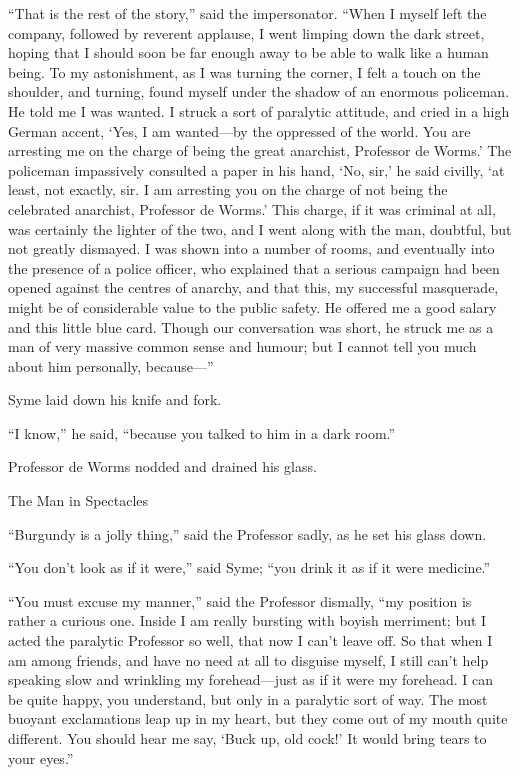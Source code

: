 “That is the rest of the story,” said the impersonator. “When I myself left the company, followed by reverent applause, I went limping down the dark street, hoping that I should soon be far enough away to be able to walk like a human being. To my astonishment, as I was turning the corner, I felt a touch on the shoulder, and turning, found myself under the shadow of an enormous policeman. He told me I was wanted. I struck a sort of paralytic attitude, and cried in a high German accent, ‘Yes, I am wanted⁠—by the oppressed of the world. You are arresting me on the charge of being the great anarchist, Professor de Worms.’ The policeman impassively consulted a paper in his hand, ‘No, sir,’ he said civilly, ‘at least, not exactly, sir. I am arresting you on the charge of not being the celebrated anarchist, Professor de Worms.’ This charge, if it was criminal at all, was certainly the lighter of the two, and I went along with the man, doubtful, but not greatly dismayed. I was shown into a number of rooms, and eventually into the presence of a police officer, who explained that a serious campaign had been opened against the centres of anarchy, and that this, my successful masquerade, might be of considerable value to the public safety. He offered me a good salary and this little blue card. Though our conversation was short, he struck me as a man of very massive common sense and humour; but I cannot tell you much about him personally, because⁠—”

Syme laid down his knife and fork.

“I know,” he said, “because you talked to him in a dark room.”

Professor de Worms nodded and drained his glass.

\chap The Man in Spectacles

“Burgundy is a jolly thing,” said the Professor sadly, as he set his glass down.

“You don’t look as if it were,” said Syme; “you drink it as if it were medicine.”

“You must excuse my manner,” said the Professor dismally, “my position is rather a curious one. Inside I am really bursting with boyish merriment; but I acted the paralytic Professor so well, that now I can’t leave off. So that when I am among friends, and have no need at all to disguise myself, I still can’t help speaking slow and wrinkling my forehead⁠—just as if it were my forehead. I can be quite happy, you understand, but only in a paralytic sort of way. The most buoyant exclamations leap up in my heart, but they come out of my mouth quite different. You should hear me say, ‘Buck up, old cock!’ It would bring tears to your eyes.”

